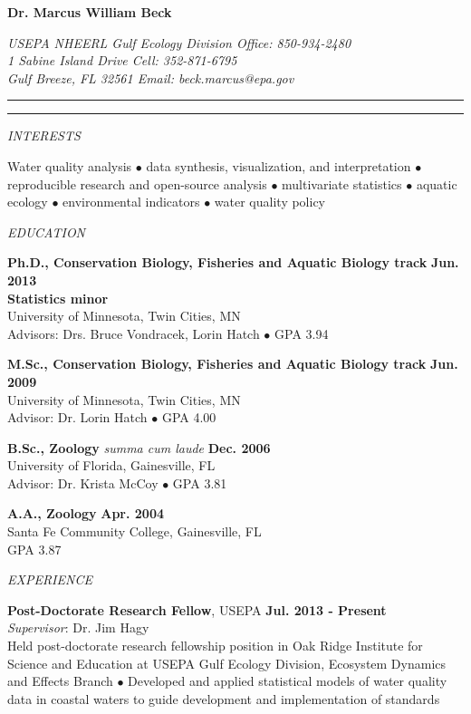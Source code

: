 \documentclass[letterpaper,12pt]{article}
\newcommand{\sectitle}[1]{\vspace{\baselineskip} \centerline{\large{\textit{#1}}}}
\begin{document}
\raggedright

\LARGE
\centerline{{\bf Dr. Marcus William Beck}}
\normalsize
\textit{USEPA NHEERL Gulf Ecology Division \hfill Office: 850-934-2480 \\
1 Sabine Island Drive \hfill Cell: 352-871-6795 \\
Gulf Breeze, FL 32561 \hfill Email: beck.marcus@epa.gov}
\vspace{4pt}
\hrule
\vspace{2pt}
\hrule
\vspace{4pt}

\sectitle{INTERESTS}

Water quality analysis $\bullet$ data synthesis, visualization, and interpretation $\bullet$ reproducible research and open-source analysis $\bullet$ multivariate statistics $\bullet$ aquatic ecology $\bullet$ environmental indicators $\bullet$ water quality policy

\sectitle{EDUCATION}

{\bf Ph.D., Conservation Biology, Fisheries and Aquatic Biology track} \hfill {\bf Jun. 2013} \\
{\bf Statistics minor} \\
University of Minnesota, Twin Cities, MN \\
Advisors: Drs. Bruce Vondracek, Lorin Hatch $\bullet$ GPA 3.94 

{\bf M.Sc., Conservation Biology, Fisheries and Aquatic Biology track} \hfill {\bf Jun. 2009} \\
University of Minnesota, Twin Cities, MN \\
Advisor: Dr. Lorin Hatch $\bullet$ GPA 4.00

{\bf B.Sc., Zoology} \textit{summa cum laude} \hfill {\bf Dec. 2006} \\
University of Florida, Gainesville, FL \\
Advisor: Dr. Krista McCoy $\bullet$ GPA 3.81

{\bf A.A., Zoology} \hfill {\bf Apr. 2004} \\
Santa Fe Community College, Gainesville, FL \\
GPA 3.87

\sectitle{EXPERIENCE}

{\bf Post-Doctorate Research Fellow}, USEPA \hfill {\bf Jul. 2013 - Present}\\
\textit{Supervisor}: Dr. Jim Hagy \\
Held post-doctorate research fellowship position in Oak Ridge Institute for Science and Education at USEPA Gulf Ecology Division, Ecosystem Dynamics and Effects Branch $\bullet$ Developed and applied statistical models of water quality data in coastal waters to guide development and implementation of standards
\end{document}
